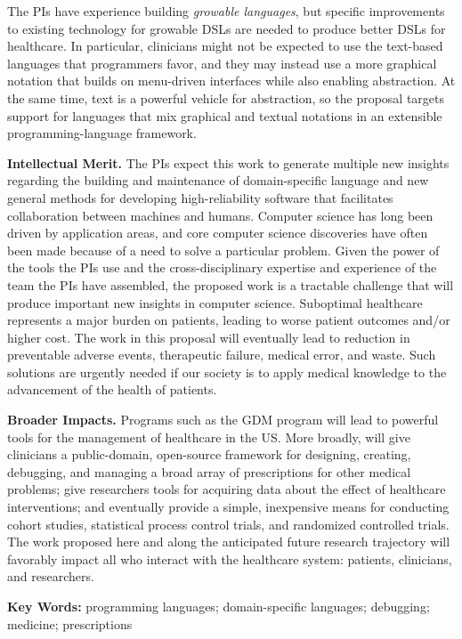 \documentclass[11pt]{article}
\begin{document}
The PIs have experience building \emph{growable languages}, but
specific improvements to existing technology for growable DSLs are
needed to produce better DSLs for healthcare.
%
In particular, clinicians might not be expected to use the text-based
languages that programmers favor, and they may instead use a more
graphical notation that builds on menu-driven interfaces while also
enabling abstraction.
%
At the same time, text is a powerful vehicle for abstraction, so the
proposal targets support for languages that mix graphical and textual
notations in an extensible programming-language framework.

\noindent
\textbf{Intellectual Merit.}  
%
The PIs expect this work to generate multiple new insights regarding the
building and maintenance of domain-specific language and new general
methods for developing high-reliability software that facilitates
collaboration between machines and humans.
%
Computer science has long been driven by application areas, and core
computer science discoveries have often been made because of a need to
solve a particular problem.
%
Given the power of the tools the PIs use and the cross-disciplinary
expertise and experience of the team the PIs have assembled, the proposed
work is a tractable challenge that will produce important new insights
in computer science.
%
Suboptimal healthcare represents a major burden on patients, leading
to worse patient outcomes and/or higher cost. 
%
The work in this proposal will eventually lead to reduction in
preventable adverse events, therapeutic failure, medical error, and
waste. 
%
Such solutions are urgently needed if our society is to apply medical
knowledge to the advancement of the health of patients.

\noindent
\textbf{Broader Impacts.} Programs such as the GDM \poppl{} program will lead
to powerful tools for the management of healthcare
in the US.
%
More broadly, \poppl{} will give clinicians a public-domain,
open-source framework for designing, creating, debugging, and managing
a broad array of prescriptions for other medical problems; give
researchers tools for acquiring data about the effect of healthcare
interventions; and eventually provide a simple, inexpensive means for
conducting cohort studies, statistical process control trials, and
randomized controlled trials.
%
The work proposed here and along the anticipated future research
trajectory will favorably impact all who interact with the healthcare
system: patients, clinicians, and researchers.

\noindent
\textbf{Key Words:} programming languages; domain-specific languages; debugging; medicine; prescriptions
\end{document}
